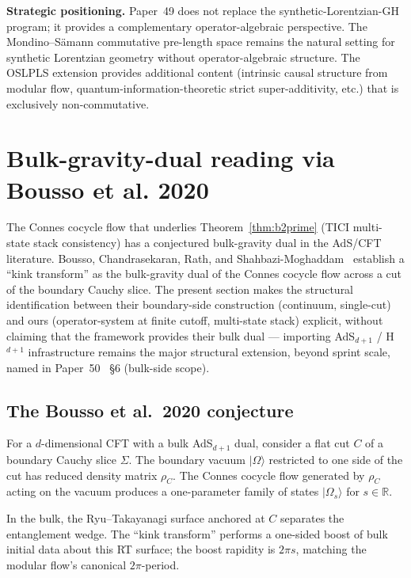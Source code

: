 \documentclass[11pt,a4paper]{article}
\theoremstyle{plain}
\theoremstyle{definition}
\begin{document}
\textbf{Strategic positioning.} Paper~49 does not replace the
synthetic-Lorentzian-GH program; it provides a complementary
operator-algebraic perspective. The Mondino--S\"amann commutative
pre-length space remains the natural setting for synthetic Lorentzian
geometry without operator-algebraic structure. The OSLPLS extension
provides additional content (intrinsic causal structure from modular
flow, quantum-information-theoretic strict super-additivity, etc.)
that is exclusively non-commutative.

\section{Bulk-gravity-dual reading via Bousso et al. 2020}
\label{sec:bousso_kink}

The Connes cocycle flow that underlies Theorem~\ref{thm:b2prime}
(TICI multi-state stack consistency) has a conjectured bulk-gravity
dual in the AdS/CFT literature. Bousso, Chandrasekaran, Rath, and
Shahbazi-Moghaddam~\cite{bousso_casini_fisher_maldacena2020} establish a
``kink transform'' as the bulk-gravity dual of the Connes cocycle
flow across a cut of the boundary Cauchy slice. The present section
makes the structural identification between their boundary-side
construction (continuum, single-cut) and ours (operator-system at
finite cutoff, multi-state stack) explicit, without claiming that
the framework provides their bulk dual --- importing AdS$_{d+1}$ /
H$^{d+1}$ infrastructure remains the major structural extension,
beyond sprint scale, named in Paper~50~\cite{paper50} \S6 (bulk-side scope).

\subsection{The Bousso et al.\ 2020 conjecture}
\label{sec:bcfm_recap}

For a $d$-dimensional CFT with a bulk AdS$_{d+1}$ dual,
\cite{bousso_casini_fisher_maldacena2020} consider a flat cut $C$ of
a boundary Cauchy slice $\Sigma$. The boundary vacuum $|\Omega\rangle$
restricted to one side of the cut has reduced density matrix
$\rho_{C}$. The Connes cocycle flow generated by $\rho_{C}$ acting on
the vacuum produces a one-parameter family of states $|\Omega_{s}\rangle$
for $s \in \mathbb{R}$.

In the bulk, the Ryu--Takayanagi surface anchored at $C$ separates
the entanglement wedge. The ``kink transform'' performs a one-sided
boost of bulk initial data about this RT surface; the boost rapidity
is $2\pi s$, matching the modular flow's canonical $2\pi$-period.
\end{document}
